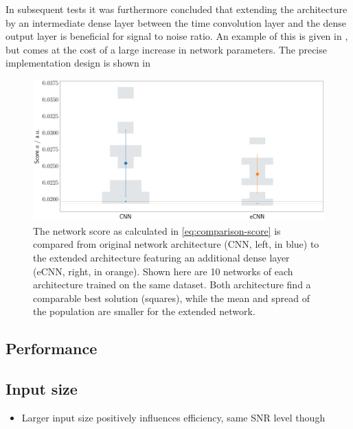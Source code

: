 In subsequent tests it was furthermore concluded that extending the architecture by an intermediate dense layer between the time convolution layer and the dense 
output layer is beneficial for signal to noise ratio. An example of this is given in , but comes at the cost of a large increase in 
network parameters. The precise implementation design is shown in 


\begin{figure}
	\centering
	\includegraphics[width=1\textwidth]{./plots/CNN_vs_eCNN.png}
	\caption{The network score as calculated in \autoref{eq:comparison-score} is compared from original network architecture (CNN, left, in blue) to the extended
	architecture featuring an additional dense layer (eCNN, right, in orange). Shown here are 10 networks of each architecture trained on the same dataset. Both
	architecture find a comparable best solution (squares), while the mean and spread of the population are smaller for the extended network.}
	\label{fig:prior-discussion}
\end{figure}





\subsection{Performance}






\subsection{Input size}
\label{ssec:input-size}

\begin{itemize}
	\item Larger input size positively influences efficiency, same SNR level though
\end{itemize}

